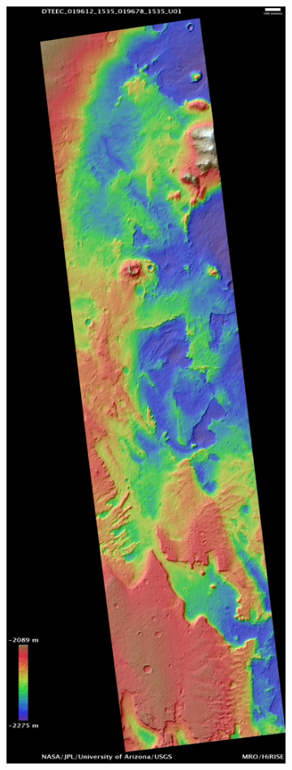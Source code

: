 \documentclass[12pt]{article}
\begin{document}
\begin{figure}[h!]
  \centering
  \begin{subfigure}[t]{0.35\textwidth}
    \centering
    \includegraphics[height=0.4\paperheight]{figures/maps/ESP_019612_1535/DTEEC_019612_1535_019678_1535_U01.jpg}

\end{subfigure}
\end{figure}
\end{document}
